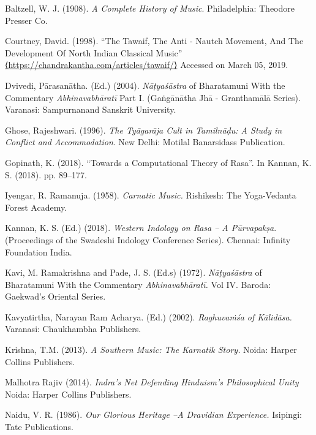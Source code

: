 \begin{thebibliography}{99}
\itemsep=0pt

  Baltzell, W. J. (1908). \textit{A Complete History of Music}. Philadelphia: Theodore Presser Co.

  Courtney, David. (1998). “The Tawaif, The Anti - Nautch Movement, And The Development Of North Indian Classical Music” \url{⟨https://chandrakantha.com/articles/tawaif/⟩} Accessed on March 05, 2019.

  Dvivedi, Pārasanātha. (Ed.) (2004). \textit{Nāṭyaśāstra} of Bharatamuni With the Commentary \textit{Abhinavabhāratī }Part I. (Gaṅgānātha Jhā - Granthamālā Series). Varanasi: Sampurnanand Sanskrit University.

  Ghose, Rajeshwari. (1996). \textit{The Tyāgarāja Cult in Tamilnāḍu: A Study in Conflict and Accommodation}. New Delhi: Motilal Banarsidass Publication.

  Gopinath, K. (2018). “Towards a Computational Theory of Rasa”. In Kannan, K. S. (2018). pp. 89--177.

  Iyengar, R. Ramanuja. (1958). \textit{Carnatic Music.} Rishikesh: The Yoga-Vedanta Forest Academy.

  Kannan, K. S. (Ed.) (2018). \textit{Western Indology on Rasa – A Pūrvapakṣa}. (Proceedings of the Swadeshi Indology Conference Series). Chennai: Infinity Foundation India.

  Kavi, M. Ramakrishna and Pade, J. S. (Ed.s) (1972). \textit{Nāṭyaśāstra} of Bharatamuni With the Commentary \textit{Abhinavabhāratī. }Vol IV. Baroda: Gaekwad’s Oriental Series.

  Kavyatirtha, Narayan Ram Acharya. (Ed.) (2002). \textit{Raghuvaṁśa of Kālidāsa.} Varanasi: Chaukhambha Publishers.

  Krishna, T.M. (2013). \textit{A Southern Music: The Karnatik Story. }Noida: Harper Collins Publishers.

  Malhotra Rajiv (2014). \textit{Indra’s Net Defending Hinduism’s Philosophical Unity }Noida: Harper Collins Publishers.

  Naidu, V. R. (1986). \textit{Our Glorious Heritage –A Dravidian Experience. }Isipingi: Tate Publications.


\end{thebibliography}

